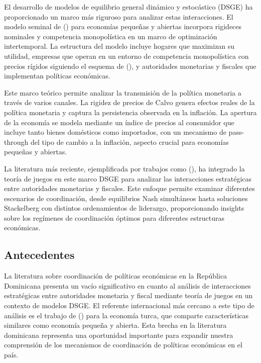 \documentclass[
  man,
  longtable,
  nolmodern,
  notxfonts,
  notimes,
  colorlinks=true,linkcolor=blue,citecolor=blue,urlcolor=blue]{apa7}
\begin{document}
El desarrollo de modelos de equilibrio general dinámico y estocástico
(DSGE) ha proporcionado un marco más riguroso para analizar estas
interacciones. El modelo seminal de
() para
economías pequeñas y abiertas incorpora rigideces nominales y
competencia monopolística en un marco de optimización intertemporal. La
estructura del modelo incluye hogares que maximizan su utilidad,
empresas que operan en un entorno de competencia monopolística con
precios rígidos siguiendo el esquema de
(), y autoridades
monetarias y fiscales que implementan políticas económicas.

Este marco teórico permite analizar la transmisión de la política
monetaria a través de varios canales. La rigidez de precios de Calvo
genera efectos reales de la política monetaria y captura la persistencia
observada en la inflación. La apertura de la economía se modela mediante
un índice de precios al consumidor que incluye tanto bienes domésticos
como importados, con un mecanismo de pass-through del tipo de cambio a
la inflación, aspecto crucial para economías pequeñas y abiertas.

La literatura más reciente, ejemplificada por trabajos como
(), ha integrado la teoría de juegos en este marco DSGE
para analizar las interacciones estratégicas entre autoridades
monetarias y fiscales. Este enfoque permite examinar diferentes
escenarios de coordinación, desde equilibrios Nash simultáneos hasta
soluciones Stackelberg con distintos ordenamientos de liderazgo,
proporcionando insights sobre los regímenes de coordinación óptimos para
diferentes estructuras económicas.

\subsection{Antecedentes}\label{antecedentes}

La literatura sobre coordinación de políticas económicas en la República
Dominicana presenta un vacío significativo en cuanto al análisis de
interacciones estratégicas entre autoridades monetaria y fiscal mediante
teoría de juegos en un contexto de modelos DSGE. El referente
internacional más cercano a este tipo de análisis es el trabajo de
() para la
economía turca, que comparte características similares como economía
pequeña y abierta. Esta brecha en la literatura dominicana representa
una oportunidad importante para expandir nuestra comprensión de los
mecanismos de coordinación de políticas económicas en el país.
\end{document}

